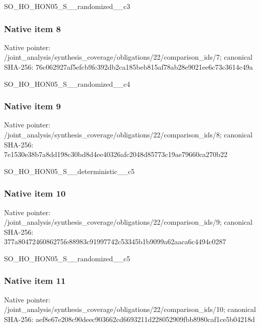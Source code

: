 \documentclass[10pt,a4paper]{article}
\begin{document}
\begingroup\raggedright\sloppy SO\_\allowbreak{}HO\_\allowbreak{}HON05\_\allowbreak{}S\_\allowbreak{}\_\allowbreak{}randomized\_\allowbreak{}\_\allowbreak{}c3\par\endgroup

\subsubsection{Native item 8}
Native pointer: /joint\_\allowbreak{}analysis/synthesis\_\allowbreak{}coverage/obligations/22/comparison\_\allowbreak{}ids/7; canonical SHA-256: 76c062927af5efcb9fc392db2ca185beb815af78ab28e9021ee6c73c3614c49a

\begingroup\raggedright\sloppy SO\_\allowbreak{}HO\_\allowbreak{}HON05\_\allowbreak{}S\_\allowbreak{}\_\allowbreak{}randomized\_\allowbreak{}\_\allowbreak{}c4\par\endgroup

\subsubsection{Native item 9}
Native pointer: /joint\_\allowbreak{}analysis/synthesis\_\allowbreak{}coverage/obligations/22/comparison\_\allowbreak{}ids/8; canonical SHA-256: 7e1530e38b7a8dd198c30bd8d4ee40326afc2048d85773c19ae79660ca270b22

\begingroup\raggedright\sloppy SO\_\allowbreak{}HO\_\allowbreak{}HON05\_\allowbreak{}S\_\allowbreak{}\_\allowbreak{}deterministic\_\allowbreak{}\_\allowbreak{}c5\par\endgroup

\subsubsection{Native item 10}
Native pointer: /joint\_\allowbreak{}analysis/synthesis\_\allowbreak{}coverage/obligations/22/comparison\_\allowbreak{}ids/9; canonical SHA-256: 377a8047246086275fe88983c91997742c53345b1b9099a62aaca6c4494c0287

\begingroup\raggedright\sloppy SO\_\allowbreak{}HO\_\allowbreak{}HON05\_\allowbreak{}S\_\allowbreak{}\_\allowbreak{}randomized\_\allowbreak{}\_\allowbreak{}c5\par\endgroup

\subsubsection{Native item 11}
Native pointer: /joint\_\allowbreak{}analysis/synthesis\_\allowbreak{}coverage/obligations/22/comparison\_\allowbreak{}ids/10; canonical SHA-256: aef8e67e208c90deec903662cd6693211d228052909fbb8980caf1ce5b04218d
\end{document}
